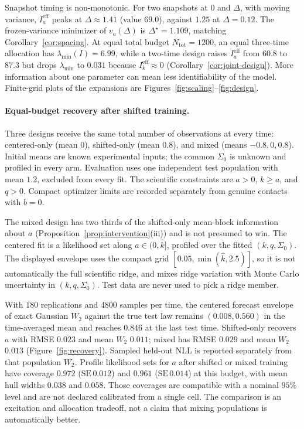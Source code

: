\documentclass[anon,11pt]{alt2027}
\begin{document}
Snapshot timing is non-monotonic. For two snapshots at $0$ and $\Delta$, with
moving variance, $I_a^{\mathrm{eff}}$ peaks at $\Delta\approx 1.41$ (value
$69.0$), against $1.25$ at $\Delta=0.12$. The frozen-variance minimizer of
$v_a(\Delta)$ is $\Delta^\star=1.109$, matching Corollary~\ref{cor:spacing}.
At equal total budget $N_{\mathrm{tot}}=1200$, an equal three-time allocation
has $\lambda_{\min}(I)=6.99$, while a two-time design raises
$I_a^{\mathrm{eff}}$ from $60.8$ to $87.3$ but drops $\lambda_{\min}$ to
$0.031$ because $I_k^{\mathrm{eff}}\approx 0$
(Corollary~\ref{cor:joint-design}). More information about one parameter can
mean less identifiability of the model. Finite-grid plots of the expansions
are Figures~\ref{fig:scaling}--\ref{fig:design}.

\paragraph{Equal-budget recovery after shifted training.}
Three designs receive the same total number of observations at every time:
centered-only (mean $0$), shifted-only (mean $0.8$), and mixed (means
$-0.8,0,0.8$). Initial means are known experimental inputs; the common
$\Sigma_0$ is unknown and profiled in every arm. Evaluation uses one
independent test population with mean $1.2$, excluded from every fit. The
scientific constraints are $a>0$, $k\ge a$, and $q>0$. Compact optimizer
limits are recorded separately from genuine contacts with $b=0$.

The mixed design has two thirds of the shifted-only mean-block information
about $a$ (Proposition~\ref{prop:intervention}(iii)) and is not presumed to
win. The centered fit is a likelihood set along $a\in(0,\hat k]$, profiled
over the fitted $(k,q,\Sigma_0)$. The displayed envelope uses the compact
grid $[0.05,\min(\hat k,2.5)]$, so it is not automatically the full
scientific ridge, and mixes ridge variation with Monte Carlo uncertainty in
$(k,q,\Sigma_0)$. Test data are never used to pick a ridge member.

With $180$ replications and $4800$ samples per time, the centered forecast
envelope of exact Gaussian $W_2$ against the true test law remains
$(0.008,0.560)$ in the time-averaged mean and reaches $0.846$ at the last test
time. Shifted-only recovers $a$ with RMSE $0.023$ and mean $W_2$ $0.011$; mixed
has RMSE $0.029$ and mean $W_2$ $0.013$ (Figure~\ref{fig:recovery}). Sampled
held-out NLL is reported separately from that population $W_2$. Profile
likelihood sets for $a$ after shifted or mixed training have coverage
$0.972$ ($\mathrm{SE}\,0.012$) and $0.961$ ($\mathrm{SE}\,0.014$) at this
budget, with mean hull widths $0.038$ and $0.058$. Those coverages are
compatible with a nominal $95\%$ level and are not declared calibrated from a
single cell. The comparison is an excitation and allocation tradeoff, not a
claim that mixing populations is automatically better.
\end{document}
